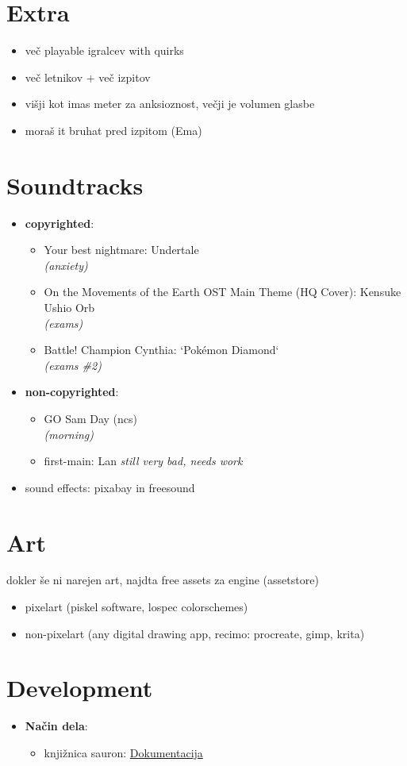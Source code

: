 \documentclass[a4paper]{article}
\begin{document}
\section{Extra}
\begin{itemize}
    \item več playable igralcev with quirks
    \item več letnikov + več izpitov
    \item višji kot imas meter za anksioznost, večji je volumen glasbe
    \item moraš it bruhat pred izpitom (Ema)
\end{itemize}

\section{Soundtracks}
\begin{itemize}
    \item \textbf{copyrighted}: \begin{itemize}
        \item Your best nightmare: Undertale \\
        \textsl{(anxiety)}
        \item On the Movements of the Earth OST \- Main Theme (HQ Cover): Kensuke Ushio Orb \\
        \textsl{(exams)}
        \item Battle! Champion Cynthia: `Pokémon Diamond`\\
        \textsl{(exams \#2)}
    \end{itemize}
    
    \item \textbf{non-copyrighted}: \begin{itemize}
        \item GO\: Sam Day (ncs) \\
        \textsl{(morning)}
        \item first-main: Lan
        \textsl{still very bad, needs work}
    \end{itemize}
    \item sound effects: pixabay in freesound
\end{itemize}

\section{Art}
dokler še ni narejen art, najdta free assets za engine (assetstore)
\begin{itemize}
    \item pixelart (piskel \- software, lospec \- colorschemes)
    \item non-pixelart (any digital drawing app, recimo: procreate, gimp, krita)
\end{itemize}

\section{Development}
\begin{itemize}
    \item \textbf{Način dela}: \begin{itemize}
        \item knjižnica sauron: \href{https://docs.rs/sauron/latest/sauron/index.html}{Dokumentacija}
    \end{itemize}
\end{itemize}
\end{document}
